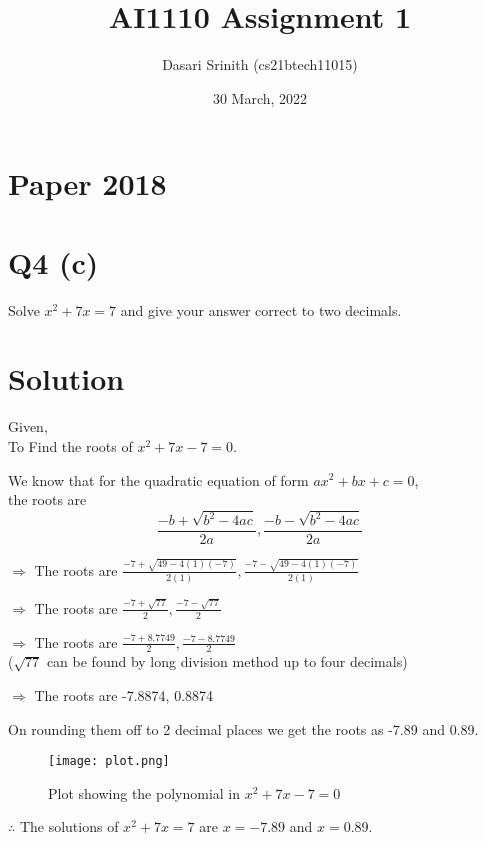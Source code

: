 \documentclass[12pt]{article}
\title{AI1110 Assignment 1}
\author{Dasari Srinith (cs21btech11015)}
\date{30 March, 2022}
\begin{document}
\maketitle
\section*{Paper 2018}

\section*{Q4 (c)}

    Solve $x^2 + 7x = 7$ and give your answer correct to two decimals.
    
\section*{Solution}

    Given,\\
    To Find the roots of $x^2 +7x -7 = 0$.
    
    We know that for the quadratic equation of form $ax^2 + bx +c = 0$,\\
    the roots are
               $$\displaystyle\frac{-b+\sqrt{b^2 -4ac}}{2a}
                       ,\displaystyle\frac{-b-\sqrt{b^2 -4ac}}{2a}$$
                       
    $\Rightarrow$ The roots are $\displaystyle\frac{-7+\sqrt{49 -4(1)(-7)}}{2(1)}
                       ,\displaystyle\frac{-7-\sqrt{49 -4(1)(-7)}}{2(1)}$
                       
    $\Rightarrow$ The roots are $\displaystyle\frac{-7+\sqrt{77}}{2}
                       ,\displaystyle\frac{-7-\sqrt{77}}{2}$
                       
    $\Rightarrow$ The roots are $\displaystyle\frac{-7+8.7749}{2}
                       ,\displaystyle\frac{-7-8.7749}{2}$\\
    ($\sqrt{77}$ can be found by long division method up to four decimals)
                       
    $\Rightarrow$ The roots are -7.8874, 0.8874
    
    On rounding them off to 2 decimal places we get the roots as -7.89 and 0.89.
    
    \begin{figure}
        \texttt{[image: plot.png]}
        \caption{Plot showing the polynomial in $x^2 +7x -7 = 0$}
    \end{figure}
    
    $\therefore$ The solutions of $x^2 + 7x = 7$ are  $x = -7.89$ and $x = 0.89$.
    
\end{document}
